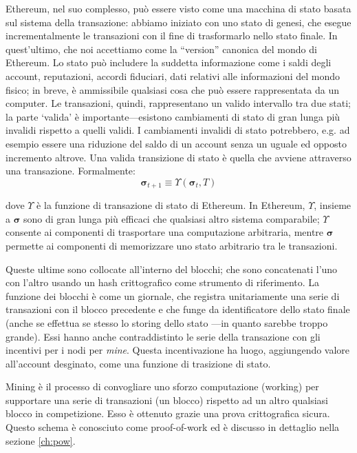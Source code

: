 \documentclass[9pt,oneside]{amsart}
\makeatletter
\newcommand*\eg{e.g.\@\xspace}
\makeatother
\begin{document}
\begin{multicols}{2}
Ethereum, nel suo complesso, può essere visto come una macchina di stato basata sul sistema della transazione: abbiamo iniziato con uno stato di genesi, che esegue incrementalmente le transazioni con il fine di trasformarlo nello stato finale. In quest'ultimo, che noi accettiamo come la ``version'' canonica del mondo di Ethereum. Lo stato può includere la suddetta informazione come i saldi degli account, reputazioni, accordi fiduciari, dati relativi alle informazioni del mondo fisico; in breve, è ammissibile qualsiasi cosa che può essere rappresentata da un computer. Le transazioni, quindi, rappresentano un valido intervallo tra due stati; la parte `valida' è importante---esistono cambiamenti di stato di gran lunga più invalidi rispetto a quelli validi. I cambiamenti invalidi di stato potrebbero, \eg ad esempio essere una riduzione del saldo di un account senza un uguale ed opposto incremento altrove. Una valida transizione di stato è quella che avviene attraverso una transazione. Formalmente:
\begin{equation}
\boldsymbol{\sigma}_{t+1} \equiv \Upsilon(\boldsymbol{\sigma}_t, T)
\end{equation}

dove $\Upsilon$ è la funzione di transazione di stato di Ethereum. In Ethereum, $\Upsilon$, insieme a $\boldsymbol{\sigma}$ sono di gran lunga più efficaci che qualsiasi altro sistema comparabile; $\Upsilon$ consente ai componenti di trasportare una computazione arbitraria, mentre $\boldsymbol{\sigma}$ permette ai componenti di memorizzare uno stato arbitrario tra le transazioni.

Queste ultime sono collocate all'interno del blocchi; che sono concatenati l'uno con l'altro usando un hash crittografico come strumento di riferimento. La funzione dei blocchi è come un giornale, che registra unitariamente una serie di transazioni con il blocco precedente e che funge da identificatore dello stato finale (anche se effettua se stesso lo storing dello stato ---in quanto sarebbe troppo grande). Essi hanno anche contraddistinto le serie della transazione con gli incentivi per i nodi per \textit{mine}. Questa incentivazione ha luogo, aggiungendo valore all'account desginato, come una funzione di trasizione di stato.

Mining è il processo di convogliare uno sforzo computazione (working) per supportare una serie di transazioni (un blocco) rispetto ad un altro qualsiasi blocco in competizione. Esso è ottenuto grazie una prova crittografica sicura. Questo schema è conosciuto come proof-of-work ed è discusso in dettaglio nella sezione \ref{ch:pow}.


\end{multicols}
\end{document}
